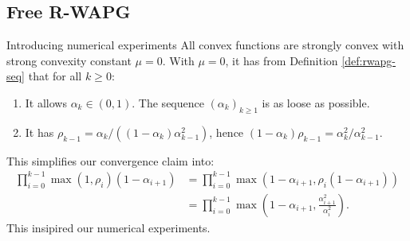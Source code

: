 \documentclass[11pt]{beamer}
\theoremstyle{definition}
\begin{document}
    \subsection{Free R-WAPG}
        \begin{frame}{Introducing numerical experiments}
            All convex functions are strongly convex with strong convexity constant $\mu = 0$. 
            With $\mu = 0$, it has from Definition \ref{def:rwapg-seq} that for all $k \ge 0$: 
            \begin{enumerate}
                \item It allows $\alpha_k \in (0, 1)$. The sequence $(\alpha_k)_{k \ge 1}$ is as loose as possible. 
                \item It has $\rho_{k - 1} = \alpha_k/((1 - \alpha_k)\alpha_{k - 1}^2)$, hence $(1 - \alpha_k)\rho_{k - 1} = \alpha_k^2/\alpha_{k - 1}^2$. 
            \end{enumerate}
            This simplifies our convergence claim into: 
            \begin{align*}
                \prod_{i = 0}^{k - 1}
                \max(1, \rho_i)(1 - \alpha_{i + 1})
                &= 
                \prod_{i = 0}^{k - 1}
                \max(1 - \alpha_{i + 1}, \rho_i(1 - \alpha_{i + 1}))
                \\
                &= 
                \prod_{i = 0}^{k - 1}
                \max\left(
                1 - \alpha_{i + 1}, \frac{\alpha_{i + 1}^2}{\alpha_i^2}\right). 
            \end{align*}
            This insipired our numerical experiments. 
        \end{frame}
\end{document}
